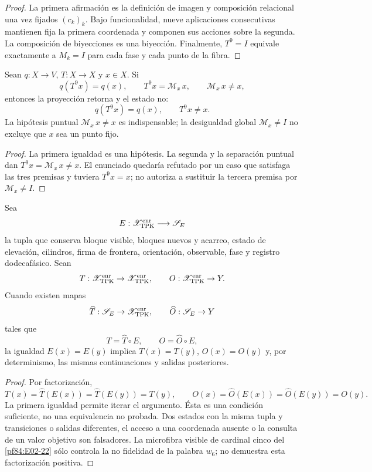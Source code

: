 \begin{proof}
La primera afirmación es la definición de imagen y composición relacional una
vez fijados \((c_k)_k\). Bajo
funcionalidad, nueve aplicaciones consecutivas mantienen fija la primera
coordenada y componen sus acciones sobre la segunda. La composición de
biyecciones es una biyección. Finalmente, \(T^9=I\) equivale exactamente a
\(M_k=I\) para cada fase y cada punto de la fibra.
\end{proof}

\begin{corollary}
\label{pf84:E02-29}
Sean \(q:X\to V\), \(T:X\to X\) y \(x\in X\). Si
\[
 q(T^9x)=q(x),\qquad
 T^9x=\mathcal M_x\,x,\qquad
 \mathcal M_x\,x\ne x,
\]
entonces la proyección retorna y el estado no:
\[
 q(T^9x)=q(x),\qquad T^9x\ne x.
\]
La hipótesis puntual \(\mathcal M_x\,x\ne x\) es indispensable; la desigualdad
global \(\mathcal M_x\ne I\) no excluye que \(x\) sea un punto fijo.
\end{corollary}

\begin{proof}
La primera igualdad es una hipótesis. La segunda y la separación puntual dan
\(T^9x=\mathcal M_x\,x\ne x\). El enunciado quedaría refutado por un caso que
satisfaga las tres premisas y tuviera \(T^9x=x\); no autoriza a sustituir la
tercera premisa por \(\mathcal M_x\ne I\).
\end{proof}

\begin{theorem}
\label{pf84:E02-30}
Sea
\[
 E:\mathscr X_{\rm TPK}^{\rm enr}\longrightarrow\mathscr S_E
\]
la tupla que conserva bloque visible, bloques nuevos y acarreo, estado de
elevación, cilindros, firma de frontera, orientación, observable, fase y
registro dodecafásico. Sean
\[
 T:\mathscr X_{\rm TPK}^{\rm enr}\to
 \mathscr X_{\rm TPK}^{\rm enr},
 \qquad
 O:\mathscr X_{\rm TPK}^{\rm enr}\to Y.
\]
Cuando existen mapas
\[
 \widehat T:\mathscr S_E\to\mathscr X_{\rm TPK}^{\rm enr},
 \qquad
 \widehat O:\mathscr S_E\to Y
\]
tales que
\[
 T=\widehat T\circ E,\qquad O=\widehat O\circ E,
\]
la igualdad \(E(x)=E(y)\) implica \(T(x)=T(y)\), \(O(x)=O(y)\) y, por
determinismo, las mismas continuaciones y salidas posteriores.
\end{theorem}

\begin{proof}
Por factorización,
\[
 T(x)=\widehat T(E(x))=\widehat T(E(y))=T(y),
 \qquad
 O(x)=\widehat O(E(x))=\widehat O(E(y))=O(y).
\]
La primera igualdad permite iterar el argumento. Ésta es una condición
suficiente, no una equivalencia no probada. Dos estados con la misma tupla y
transiciones o salidas diferentes, el acceso a una coordenada ausente o la
consulta de un valor objetivo son falsadores. La microfibra visible de
cardinal cinco del \cref{pf84:E02-22} sólo controla la no fidelidad de la
palabra \(w_6\); no demuestra esta factorización positiva.
\end{proof}

